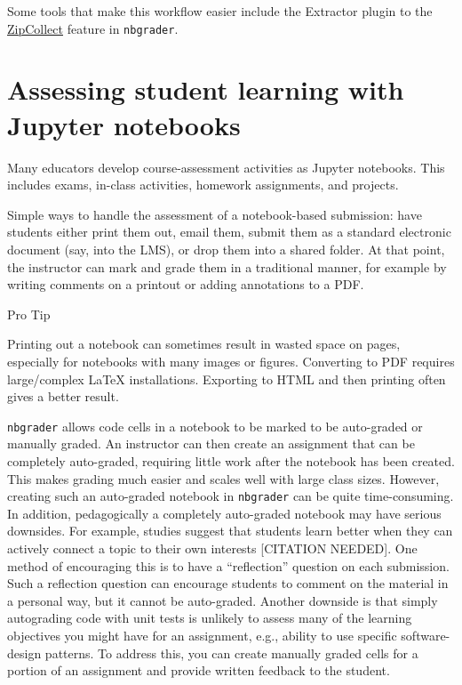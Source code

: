 \documentclass[]{book}
\begin{document}
Some tools that make this workflow easier include the Extractor plugin
to the
\href{https://nbgrader.readthedocs.io/en/stable/plugins/zipcollect-plugin.html}{ZipCollect}
feature in \texttt{nbgrader}.

\section{Assessing student learning with Jupyter
notebooks}\label{assessing-student-learning-with-jupyter-notebooks}

Many educators develop course-assessment activities as Jupyter
notebooks. This includes exams, in-class activities, homework
assignments, and projects.

Simple ways to handle the assessment of a notebook-based submission:
have students either print them out, email them, submit them as a
standard electronic document (say, into the LMS), or drop them into a
shared folder. At that point, the instructor can mark and grade them in
a traditional manner, for example by writing comments on a printout or
adding annotations to a PDF.

Pro Tip

Printing out a notebook can sometimes result in wasted space on pages,
especially for notebooks with many images or figures. Converting to PDF
requires large/complex LaTeX installations. Exporting to HTML and then
printing often gives a better result.

\texttt{nbgrader} allows code cells in a notebook to be marked to be
auto-graded or manually graded. An instructor can then create an
assignment that can be completely auto-graded, requiring little work
after the notebook has been created. This makes grading much easier and
scales well with large class sizes. However, creating such an
auto-graded notebook in \texttt{nbgrader} can be quite time-consuming.
In addition, pedagogically a completely auto-graded notebook may have
serious downsides. For example, studies suggest that students learn
better when they can actively connect a topic to their own interests
{[}CITATION NEEDED{]}. One method of encouraging this is to have a
``reflection'' question on each submission. Such a reflection question
can encourage students to comment on the material in a personal way, but
it cannot be auto-graded. Another downside is that simply autograding
code with unit tests is unlikely to assess many of the learning
objectives you might have for an assignment, e.g., ability to use
specific software-design patterns. To address this, you can create
manually graded cells for a portion of an assignment and provide written
feedback to the student.
\end{document}
